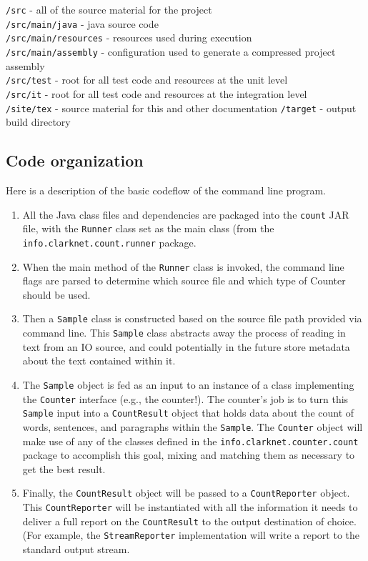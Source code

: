 \documentclass{article}
\begin{document}
\texttt{/src} - all of the source material for the project \\
\texttt{/src/main/java} - java source code \\
\texttt{/src/main/resources} - resources used during execution \\
\texttt{/src/main/assembly} - configuration used to generate a compressed project assembly \\
\texttt{/src/test} - root for all test code and resources at the unit level \\
\texttt{/src/it} - root for all test code and resources at the integration level \\
\texttt{/site/tex} - source material for this and other documentation
\texttt{/target} - output build directory

\subsection{Code organization}
Here is a description of the basic codeflow of the command line program.
\begin{enumerate}
 \item All the Java class files and dependencies are packaged into the \texttt{count} JAR file, with the \texttt{Runner} class set as the main class (from the \texttt{info.clarknet.count.runner} package.
 \item When the main method of the \texttt{Runner} class is invoked, the command line flags are parsed to determine which source file and which type of Counter should be used.
 \item Then a \texttt{Sample} class is constructed based on the source file path provided via command line. This \texttt{Sample} class abstracts away the process of reading in text from an IO source, and could potentially in the future store metadata about the text contained within it.
 \item The \texttt{Sample} object is fed as an input to an instance of a class implementing the \texttt{Counter} interface (e.g., the counter!). The counter's job is to turn this \texttt{Sample} input into a \texttt{CountResult} object that holds data about the count of words, sentences, and paragraphs within the \texttt{Sample}. The \texttt{Counter} object will make use of any of the classes defined in the \texttt{info.clarknet.counter.count} package to accomplish this goal, mixing and matching them as necessary to get the best result.
 \item Finally, the \texttt{CountResult} object will be passed to a \texttt{CountReporter} object. This \texttt{CountReporter} will be instantiated with all the information it needs to deliver a full report on the \texttt{CountResult} to the output destination of choice. (For example, the \texttt{StreamReporter} implementation will write a report to the standard output stream.
\end{enumerate}
\end{document}
